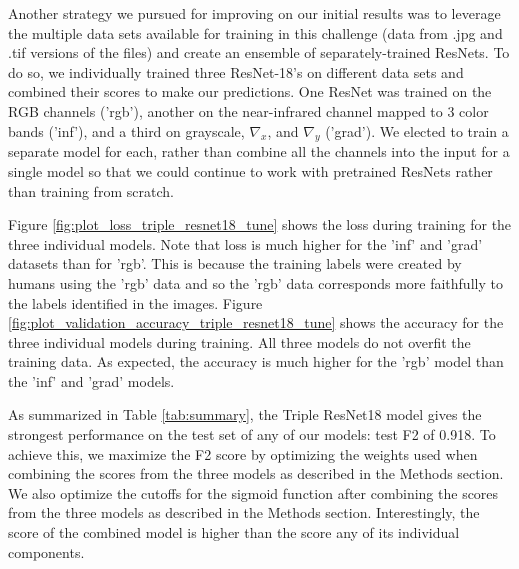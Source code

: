 \documentclass[10pt,twocolumn,letterpaper]{article}
\begin{document}
Another strategy we pursued for improving on our initial results was to leverage the multiple data sets available for training in this challenge (data from .jpg and .tif versions of the files) and create an ensemble of separately-trained ResNets. To do so, we individually trained three ResNet-18's on different data sets and combined their scores to make our predictions. One ResNet was trained on the RGB channels ('rgb'), another on the near-infrared channel mapped to 3 color bands ('inf'), and a third on grayscale, $\nabla_x$, and $\nabla_y$ ('grad'). We elected to train a separate model for each, rather than combine all the channels into the input for a single model so that we could continue to work with pretrained ResNets rather than training from scratch.

Figure \ref{fig:plot_loss_triple_resnet18_tune} shows the loss during training for the three individual models. Note that loss is much higher for the 'inf' and 'grad' datasets than for 'rgb'. This is because the training labels were created by humans using the 'rgb' data and so the 'rgb' data corresponds more faithfully to the labels identified in the images. Figure \ref{fig:plot_validation_accuracy_triple_resnet18_tune} shows the accuracy for the three individual models during training. All three models do not overfit the training data. As expected, the accuracy is much higher for the 'rgb' model than the 'inf' and 'grad' models. 

As summarized in Table \ref{tab:summary}, the Triple ResNet18 model gives the strongest performance on the test set of any of our models: test F2 of 0.918. To achieve this, we maximize the F2 score by optimizing the weights used when combining the scores from the three models as described in the Methods section. We also optimize the cutoffs for the sigmoid function after combining the scores from the three models as described in the Methods section. Interestingly, the score of the combined model is higher than the score any of its individual components.
\end{document}
